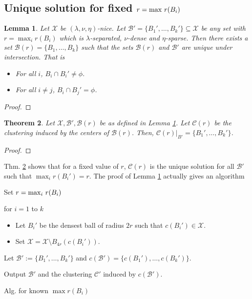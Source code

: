 \documentclass[twoside]{article}
\newcommand{\mc}{\mathcal}
\newtheorem{theorem}{Theorem}
\newtheorem{lemma}[theorem]{Lemma}
\newenvironment{alg}{
    \begin{list}{}{
        \setlength{\itemsep}{2pt}
        \setlength{\parsep}{0pt}
        \setlength{\parskip}{0pt}
        \setlength{\topsep}{1pt}
    }
}
{
    \end{list}
}
\begin{document}
\subsection{Unique solution for fixed $r = \max \thinspace r(B_i)$}
\begin{lemma}
\label{lemma:uniqueR}
Let $\mc X$ be $(\lambda, \nu, \eta)$-nice. Let $\mc B' = \{B_1',\ldots, B_k'\} \subseteq \mc X$ be any set with $r = \max_i r(B_i)$ which is $\lambda$-separated, $\nu$-dense and $\eta$-sparse. Then there exists a set $\mc B(r) = \{B_1,\ldots,B_k\}$ such that the sets $\mc B(r)$ and $\mc B'$ are unique under intersection. That is 
\begin{itemize}[nolistsep]
\item For all $i$, $B_i \cap B_i' \neq \phi$. 
\item For all $i\neq j$, $B_i \cap B_j' = \phi$.
\end{itemize}
\end{lemma} 
\begin{proof}
\end{proof}

\begin{theorem}
\label{theorem:uniqueR}
Let $\mc X, \mc B', \mc B(r)$ be as defined in Lemma \ref{lemma:uniqueR}. Let $\mc C(r)$ be the clustering induced by the centers of $\mc B(r)$. Then, $\mc C(r)|_{B'} = \{B_1', \ldots, B_k'\}$. 
\end{theorem}
\begin{proof}
\end{proof}

Thm. \ref{theorem:uniqueR} shows that for a fixed value of $r$, $\mc C(r)$ is the unique solution for all $\mc B'$ such that $\max_i r(B_i') = r$. The proof of Lemma \ref{lemma:uniqueR} actually gives an algorithm   

\begin{algorithm}
\begin{alg}
\item[] Set $r = \max_i \thinspace r(B_i)$
\item[] for $i=1$ to $k$
	\begin{itemize}
		\item[] Let $B_i'$ be the densest ball of radius $2r$ such that $c(B_i') \in \mathcal{X}$.
		\item[] Set $\mc X=\mc X\setminus B_{4r}(c(B_i'))$. 
	\end{itemize}
\item[] Let $\mc B' := \{B_1',\ldots,B_k'\}$ and $c(\mc B') = \{c(B_1'),\ldots,c(B_k')\}$.
\item[] Output $\mc B'$ and the clustering $\mc C'$ induced by $c(\mc B')$.
\label{alg:NotKnown}
\end{alg}
\caption{Alg. for known $\max{r(B_i)}$}
\end{algorithm}
\end{document}
